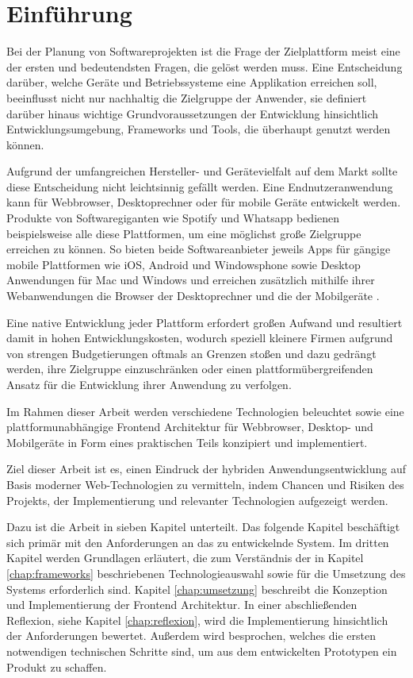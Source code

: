 
\chapter{Einführung}
\label{chap:introduction}

Bei der Planung von Softwareprojekten ist die Frage der Zielplattform meist eine der ersten und bedeutendsten Fragen,
die gelöst werden muss. Eine Entscheidung darüber, welche Geräte und Betriebssysteme eine Applikation erreichen soll,
beeinflusst nicht nur nachhaltig die Zielgruppe der Anwender, sie definiert darüber hinaus wichtige Grundvoraussetzungen der Entwicklung hinsichtlich Entwicklungsumgebung, Frameworks und Tools, die überhaupt genutzt werden können.

Aufgrund der umfangreichen Hersteller- und Gerätevielfalt auf dem Markt sollte diese Entscheidung nicht leichtsinnig gefällt werden.
Eine Endnutzeranwendung kann für Webbrowser, Desktoprechner oder für mobile Geräte entwickelt werden.
Produkte von Softwaregiganten wie Spotify und Whatsapp bedienen beispielsweise alle diese Plattformen, um eine möglichst große Zielgruppe erreichen zu können.
So bieten beide Softwareanbieter jeweils Apps für gängige mobile Plattformen wie iOS, Android und Windowsphone
sowie Desktop Anwendungen für Mac und Windows und erreichen zusätzlich mithilfe ihrer Webanwendungen die Browser der Desktoprechner
und die der Mobilgeräte \cite{Spoti93:online} \cite{Whats74:online} \cite{Whats6:online}.

Eine native Entwicklung jeder Plattform erfordert großen Aufwand und resultiert damit in hohen
Entwicklungskosten, wodurch speziell kleinere Firmen aufgrund von strengen Budgetierungen oftmals
an Grenzen stoßen und
dazu gedrängt werden, ihre Zielgruppe einzuschränken oder einen plattformübergreifenden Ansatz für
die Entwicklung ihrer Anwendung zu verfolgen.

Im Rahmen dieser Arbeit werden verschiedene Technologien beleuchtet sowie eine
plattformunabhängige Frontend Architektur für Webbrowser, Desktop- und Mobilgeräte in Form eines praktischen Teils
konzipiert und implementiert.

Ziel dieser Arbeit ist es, einen Eindruck der hybriden Anwendungsentwicklung auf Basis moderner
Web-Technologien zu vermitteln, indem Chancen und Risiken des Projekts, der Implementierung und relevanter Technologien aufgezeigt werden.

\vspace{0.6cm}

\noindent
Dazu ist die Arbeit in sieben Kapitel unterteilt. Das folgende Kapitel beschäftigt sich primär mit den
Anforderungen an das zu entwickelnde System.
Im dritten Kapitel werden Grundlagen erläutert, die zum Verständnis der in Kapitel \ref{chap:frameworks} beschriebenen Technologieauswahl
sowie für die Umsetzung des Systems erforderlich sind.
Kapitel \ref{chap:umsetzung} beschreibt die Konzeption und Implementierung der Frontend Architektur.
In einer abschließenden Reflexion, siehe Kapitel \ref{chap:reflexion}, wird die Implementierung hinsichtlich der Anforderungen bewertet.
Außerdem wird besprochen, welches die ersten notwendigen technischen Schritte sind, um aus dem entwickelten Prototypen ein Produkt zu schaffen.
